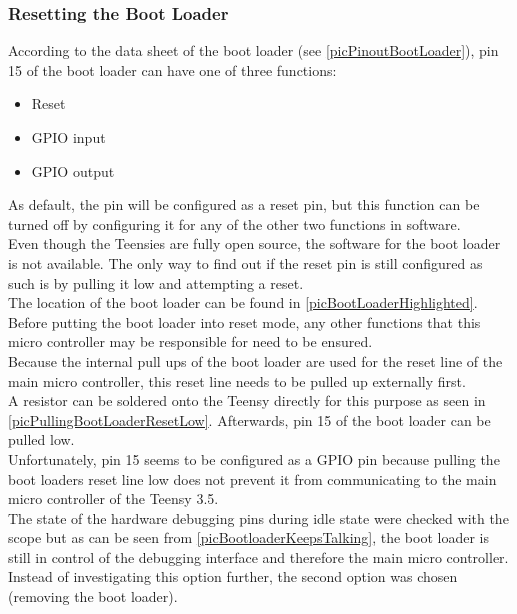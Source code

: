 \subsubsection{Resetting the Boot Loader} \label{txtResettingTheBootLoader}
According to the data sheet of the boot loader (see \autoref{picPinoutBootLoader}), pin 15 of the boot loader can have one of three functions:
\begin{itemize}
    \item Reset
    \item GPIO input
    \item GPIO output
\end{itemize}
As default, the pin will be configured as a reset pin, but this function can be turned off by configuring it for any of the other two functions in software. \\
Even though the Teensies are fully open source, the software for the boot loader is not available. The only way to find out if the reset pin is still configured as such is by pulling it low and attempting a reset. \\
The location of the boot loader can be found in \autoref{picBootLoaderHighlighted}.\\
Before putting the boot loader into reset mode, any other functions that this micro controller may be responsible for need to be ensured. \\
Because the internal pull ups of the boot loader are used for the reset line of the main micro controller, this reset line needs to be pulled up externally first. \\
A resistor can be soldered onto the Teensy directly for this purpose as seen in \autoref{picPullingBootLoaderResetLow}. Afterwards, pin 15 of the boot loader can be pulled low. \\
Unfortunately, pin 15 seems to be configured as a GPIO pin because pulling the boot loaders reset line low does not prevent it from communicating to the main micro controller of the Teensy 3.5. \\
The state of the hardware debugging pins during idle state were checked with the scope but as can be seen from \autoref{picBootloaderKeepsTalking}, the boot loader is still in control of the debugging interface and therefore the main micro controller.\\
Instead of investigating this option further, the second option was chosen (removing the boot loader). \\
%
